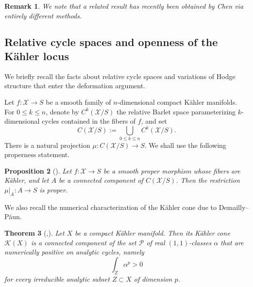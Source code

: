 \documentclass[11pt,letterpaper]{amsart}
\numberwithin{equation}{section}
\newcommand{\cal}{\mathcal}
\def\cX{{\cal X}}
\newtheorem{prop}{Proposition}[section]
\newtheorem{theo}[prop]{Theorem}
\newtheorem{rema}[prop]{Remark}
\begin{document}
\begin{rema}We note that a related result has recently been obtained by Chen \cite{Chen} via entirely different methods.
\end{rema}


\subsection{Relative cycle spaces and openness of the K\"ahler locus}
We briefly recall the facts about relative cycle spaces and variations of Hodge structure that enter the deformation argument.

Let $f:\cX\to S$ be a smooth family of $n$-dimensional compact K\"ahler manifolds. For $0\le k\le n$, denote by $C^k(\cX/S)$ the relative Barlet space parameterizing $k$-dimensional cycles contained in the fibers of $f$, and set
\[
 C(\cX/S):=\bigcup_{0\le k\le n}C^k(\cX/S).
\]
There is a natural projection $\mu:C(\cX/S)\to S$. We shall use the following properness statement.

\begin{prop}[{\cite[Proposition 3.9]{LL24}}]\label{prop-1}
Let $f:\cX\to S$ be a smooth proper morphism whose fibers are K\"ahler, and let $A$ be a connected component of $C(\cX/S)$. Then the restriction $\mu|_A:A\to S$ is proper.
\end{prop}

We also recall the numerical characterization of the K\"ahler cone due to Demailly--P\u{a}un.
\begin{theo}[{\cite[Main Theorem 0.1]{DP04},\cite[Corollary 1.3]{CT15}}]\label{Kahler}
Let $X$ be a compact K\"ahler manifold. Then its K\"ahler cone $\mathcal K(X)$ is a connected component of the set $\mathcal P$ of real $(1,1)$-classes $\alpha$ that are numerically positive on analytic cycles, namely
\[
 \int_Z\alpha^p>0
\]
for every irreducible analytic subset $Z\subset X$ of dimension $p$.
\end{theo}
\end{document}
